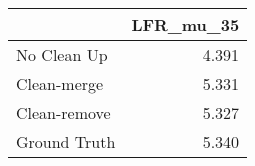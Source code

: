 \begin{tabular}{lr}
\toprule
{} & LFR_mu_35 \\
\midrule
No Clean Up  &     4.391 \\
Clean-merge  &     5.331 \\
Clean-remove &     5.327 \\
Ground Truth &     5.340 \\
\bottomrule
\end{tabular}
